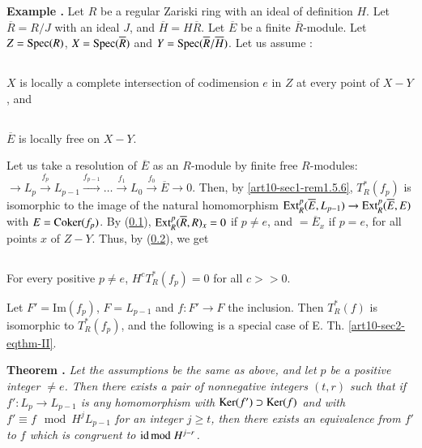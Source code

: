\medskip
\noindent
{\bf Example .\label{art10-sec3-exam-III}}
Let $R$ be a regular Zariski ring with an ideal of definition $H$. Let $\overline{R}=R/J$ with an ideal $J$, and $\overline{H}=H\overline{R}$. Let $\overline{E}$ be a finite $\overline{R}$-module. Let $Z=\operatorname{Spec} (R)$, $X=\operatorname{Spec} (\overline{R})$ and $Y=\operatorname{Spec} (\overline{R}/\overline{H})$. Let us assume :

\setcounter{subsection}{7}
\subsection{}\label{art10-sec3.8}
$X$ is locally a complete intersection of codimension $e$ in $Z$ at every point of $X-Y$, and

\subsection{}\label{art10-sec3.9}
$\overline{E}$ is locally free on $X-Y$.

Let us take a resolution of $\overline{E}$ as an $R$-module by finite free $R$-modules: $\to L_{p}\xrightarrow{f_{p}}L_{p-1}\xrightarrow{f_{p-1}}\ldots\xrightarrow{f_{1}}L_{0}\xrightarrow{f_{0}}\overline{E}\to 0$. Then, by \ref{art10-sec1-rem1.5.6}, $T^{*}_{R}(f_{p})$ is isomorphic to the image of the natural homomorphism $\operatorname{\mathrm{Ext}}^{p}_{R}(\overline{E},L_{p-1})\to \operatorname{\mathrm{Ext}}^{p}_{R}(\overline{E},E)$ with $E=\operatorname{\mathrm{Coker}} (f_{p})$. By (\ref{art10-sec3.8}), $\operatorname{\mathrm{Ext}}^{p}_{R}(\overline{R},R)_{x}=0$ if $p\neq e$, and $=\overline{E}_{x}$ if $p=e$, for all points $x$ of $Z-Y$. Thus, by (\ref{art10-sec3.9}), we get

\setcounter{subsection}{9}
\subsection{}\label{art10-sec3.10}
For every positive $p\neq e$, $H^{c}T^{*}_{R}(f_{p})=0$ for all $c>>0$.

Let $F'=\text{Im}(f_{p})$, $F=L_{p-1}$ and $f:F'\to F$ the inclusion. Then $T^{*}_{R}(f)$ is isomorphic to $T^{*}_{R}(f_{p})$, and the following is a special case of E. Th. \ref{art10-sec2-eqthm-II}.

\medskip
\noindent
{\bf Theorem .\label{art10-sec3-thm3.11}}
{\em Let the assumptions be the same as above, and let $p$ be a positive integer $\neq e$. Then there exists a pair of nonnegative integers $(t,r)$ such that if $f':L_{p}\to L_{p-1}$ is any homomorphism with $\operatorname{\mathrm{Ker}} (f')\supset \operatorname{\mathrm{Ker}} (f)$ and with $f'\equiv f\mod H^{j}L_{p-1}$ for an integer $j\geq t$, then there exists an equivalence from $f'$ to $f$ which is congruent to $\operatorname{\mathrm{id}} {\rm{mod}}\kern.3em H^{j-r}$.}

